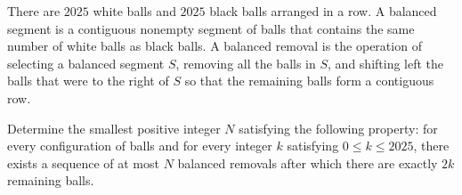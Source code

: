 There are $2025$ white balls and $2025$ black balls arranged in a row. A balanced segment is a contiguous nonempty segment of balls that contains the same number of white balls as black balls. A balanced removal is the operation of selecting a balanced segment $S$, removing all the balls in $S$, and shifting left the balls that were to the right of $S$ so that the remaining balls form a contiguous row.

Determine the smallest positive integer $N$ satisfying the following property: for every configuration of balls and for every integer $k$ satisfying $0\leq k\leq 2025$, there exists a sequence of at most $N$ balanced removals after which there are exactly $2k$ remaining balls.
